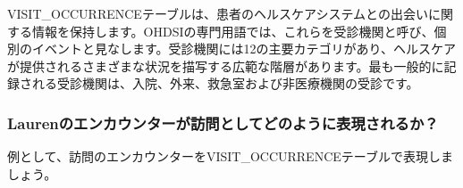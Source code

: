 \documentclass[
  11pt]{book}
\theoremstyle{definition}
\theoremstyle{definition}
\theoremstyle{definition}
\theoremstyle{definition}
\theoremstyle{remark}
\begin{document}
VISIT\_OCCURRENCEテーブルは、患者のヘルスケアシステムとの出会いに関する情報を保持します。OHDSIの専門用語では、これらを受診機関と呼び、個別のイベントと見なします。受診機関には12の主要カテゴリがあり、ヘルスケアが提供されるさまざまな状況を描写する広範な階層があります。最も一般的に記録される受診機関は、入院、外来、救急室および非医療機関の受診です。

\subsubsection*{Laurenのエンカウンターが訪問としてどのように表現されるか？}\label{laurenux306eux30a8ux30f3ux30abux30a6ux30f3ux30bfux30fcux304cux8a2aux554fux3068ux3057ux3066ux3069ux306eux3088ux3046ux306bux8868ux73feux3055ux308cux308bux304b}

例として、訪問のエンカウンターをVISIT\_OCCURRENCEテーブルで表現しましょう。
\end{document}
